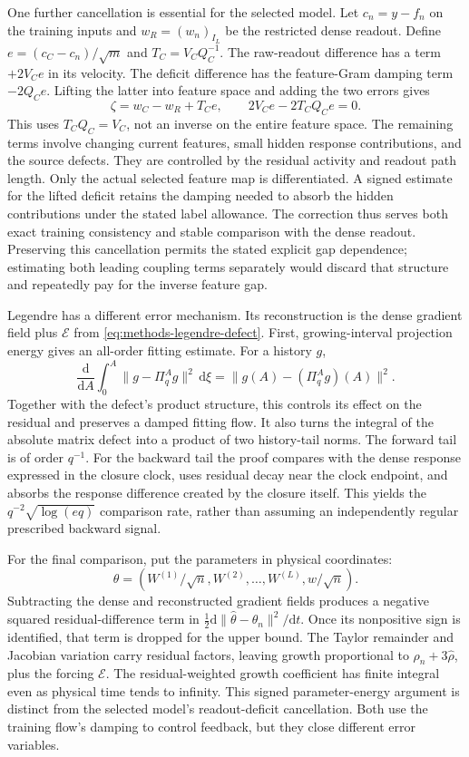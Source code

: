 One further cancellation is essential for the selected model. Let
$c_n=y-f_n$ on the training inputs and $w_R=(w_n)_{I_L}$ be the
restricted dense readout. Define
$e=(c_C-c_n)/\sqrt m$ and $T_C=V_CQ_C^{-1}$.
The raw-readout difference has a term $+2V_Ce$ in its velocity. The
deficit difference has the feature-Gram damping term $-2Q_Ce$.
Lifting the latter into feature space and adding the two errors gives
\begin{equation}
 \zeta=w_C-w_R+T_Ce,
 \qquad 2V_Ce-2T_CQ_Ce=0.
 \label{eq:methods-readout-cancellation}
\end{equation}
This uses $T_CQ_C=V_C$, not an inverse on the entire feature space.
The remaining terms involve changing current features, small hidden
response contributions, and the source defects. They are controlled by
the residual activity and readout path length. Only the actual selected
feature map is differentiated. A signed estimate for the lifted deficit
retains the damping needed to absorb the hidden contributions under the
stated label allowance. The correction thus serves both exact training
consistency and stable comparison with the dense readout.
Preserving this cancellation permits the stated explicit gap dependence;
estimating both leading coupling terms separately would discard that
structure and repeatedly pay for the inverse feature gap.

Legendre has a different error mechanism. Its reconstruction is the dense
gradient field plus $\mathcal E$ from
\eqref{eq:methods-legendre-defect}. First, growing-interval projection
energy gives an all-order fitting estimate. For a history $g$,
\[
 \frac{\mathrm d}{\mathrm dA}
 \int_0^A\|g-\Pi_q^Ag\|^2\,\mathrm d\xi
 =\|g(A)-(\Pi_q^Ag)(A)\|^2.
\]
Together with the defect's product structure, this controls its effect on
the residual and preserves a damped fitting flow. It also turns the
integral of the absolute matrix defect into a product of two history-tail
norms. The forward tail is of order $q^{-1}$. For the backward tail the
proof compares with the dense response expressed in the closure clock,
uses residual decay near the clock endpoint, and absorbs the response
difference created by the closure itself. This yields the
$q^{-2}\sqrt{\log(eq)}$ comparison rate, rather than assuming an
independently regular prescribed backward signal.

For the final comparison, put the parameters in physical coordinates:
\[
 \theta=(W^{(1)}/\sqrt n,W^{(2)},\ldots,W^{(L)},w/\sqrt n).
\]
Subtracting the dense and reconstructed gradient fields produces a
negative squared residual-difference term in
$\tfrac12\mathrm d\|\widehat\theta-\theta_n\|^2/\mathrm dt$.
Once its nonpositive sign is identified, that term is dropped for the
upper bound. The Taylor remainder and Jacobian variation carry residual
factors, leaving growth proportional to $\rho_n+3\widehat\rho$, plus
the forcing $\mathcal E$. The residual-weighted growth coefficient has
finite integral even as physical time tends to
infinity. This signed parameter-energy argument is distinct from the
selected model's readout-deficit cancellation. Both use the training
flow's damping to control feedback, but they close different error variables.

